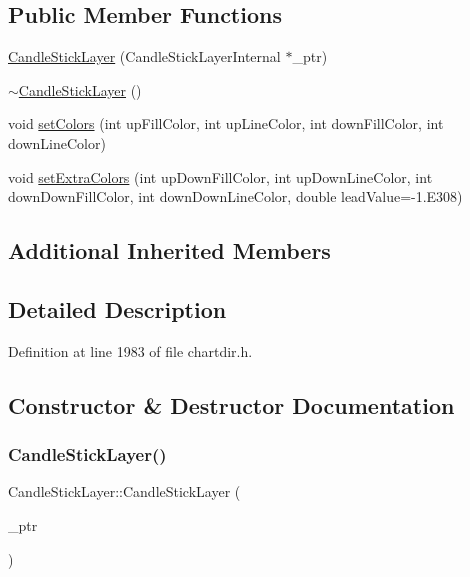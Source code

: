 \subsection*{Public Member Functions}
\begin{DoxyCompactItemize}
\item 
\hyperlink{class_candle_stick_layer_aff55538cfd1a1876f61cf0db4a20411f}{Candle\+Stick\+Layer} (Candle\+Stick\+Layer\+Internal $\ast$\+\_\+ptr)
\item 
\hyperlink{class_candle_stick_layer_a57d641c9ae2201639bdefbc51a4b3a0e}{$\sim$\+Candle\+Stick\+Layer} ()
\item 
void \hyperlink{class_candle_stick_layer_a7c5dfc382c750c6c1f358254d3ab7751}{set\+Colors} (int up\+Fill\+Color, int up\+Line\+Color, int down\+Fill\+Color, int down\+Line\+Color)
\item 
void \hyperlink{class_candle_stick_layer_aea51bb1fa87f27d6867dda9c00a917eb}{set\+Extra\+Colors} (int up\+Down\+Fill\+Color, int up\+Down\+Line\+Color, int down\+Down\+Fill\+Color, int down\+Down\+Line\+Color, double lead\+Value=-\/1.\+E308)
\end{DoxyCompactItemize}
\subsection*{Additional Inherited Members}


\subsection{Detailed Description}


Definition at line 1983 of file chartdir.\+h.



\subsection{Constructor \& Destructor Documentation}
\mbox{\label{class_candle_stick_layer_aff55538cfd1a1876f61cf0db4a20411f}} 
\subsubsection{\texorpdfstring{Candle\+Stick\+Layer()}{CandleStickLayer()}}
{\footnotesize\ttfamily Candle\+Stick\+Layer\+::\+Candle\+Stick\+Layer (\begin{DoxyParamCaption}\item[{Candle\+Stick\+Layer\+Internal $\ast$}]{\+\_\+ptr }\end{DoxyParamCaption})\hspace{0.3cm}{\ttfamily [inline]}}



